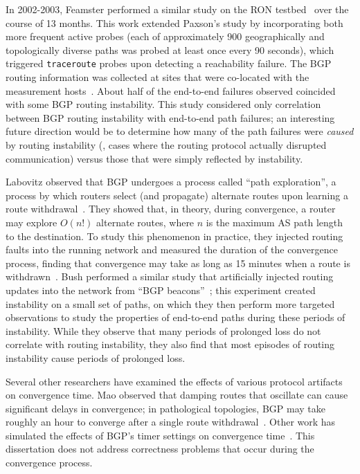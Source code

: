 In 2002-2003, Feamster \ea performed a similar study on the RON
testbed~\cite{Andersen-ccr2003} over the course of 13 months.  This work
extended Paxson's study by incorporating both more frequent active
probes (each of approximately 900 geographically and topologically
diverse paths was probed at least once every 90 seconds), which
triggered {\tt traceroute} probes upon detecting a reachability failure.
The BGP routing information was collected at sites that were co-located
with the measurement hosts~\cite{Feamster2003}.  About half of the
end-to-end failures observed coincided with some BGP routing
instability.  This study considered only correlation between BGP routing
instability with end-to-end path failures; an interesting future
direction would be to determine how many of the path failures were {\em
caused} by routing instability (\ie, cases where the routing protocol
actually disrupted communication) versus those that were simply
reflected by instability.





Labovitz \ea observed that BGP undergoes a process called ``path
exploration'', a process by which routers select (and propagate)
alternate routes upon learning a route withdrawal~\cite{labovitz:ton01}.
They showed that, in theory, during convergence, a router may explore
$O(n!)$ alternate 
routes, where $n$ is the maximum AS path length to the destination.  To
study this phenomenon in practice, they injected routing faults into the
running network and measured the duration of the convergence process,
finding that convergence may take as long as 15 minutes when a route is
withdrawn~\cite{labovitz:ton01}.  Bush \ea performed a similar study
that artificially injected routing updates into the network from ``BGP
beacons''~\cite{Mao2003b}; this experiment created instability on a
small set of paths, on which they then perform more targeted
observations to study the properties of end-to-end paths during these
periods of instability.  While they observe that many periods of
prolonged loss do not correlate with routing instability, they also find
that most episodes of routing instability cause periods of prolonged
loss.

Several other researchers have examined the effects of various protocol
artifacts on convergence time.  Mao \ea observed that damping routes
that oscillate can cause significant delays in convergence; in
pathological topologies, BGP may take roughly an hour to converge after
a single route withdrawal~\cite{Mao2002}.  Other work has simulated the
effects of BGP's timer settings on convergence time~\cite{Griffin2001}.
This dissertation does not address correctness problems that occur
during the convergence process.

